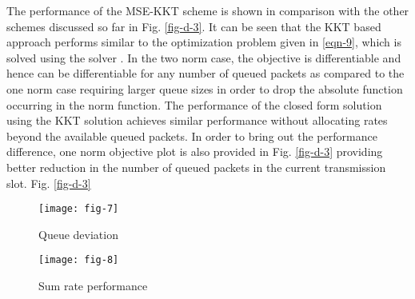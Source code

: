 The performance of the \ac{MSE}-\ac{KKT} scheme is shown in comparison with the other schemes discussed so far in Fig. \ref{fig-d-3}. It can be seen that the \ac{KKT} based approach performs similar to the optimization problem given in \eqref{eqn-9}, which is solved using the solver \cite{grant2008cvx}. In the two norm case, the objective is differentiable and hence can be differentiable for any number of queued packets as compared to the one norm case requiring larger queue sizes in order to drop the absolute function occurring in the norm function. The performance of the closed form solution using the \ac{KKT} solution achieves similar performance without allocating rates beyond the available queued packets. In order to bring out the performance difference, one norm objective plot is also provided in Fig. \ref{fig-d-3} providing better reduction in the number of queued packets in the current transmission slot.
Fig. \ref{fig-d-3}
\begin{figure*}
\centering
\begin{subfigure}{0.49\textwidth}
\texttt{[image: fig-7]}
\caption{Queue deviation}
\end{subfigure}
\hfill
\begin{subfigure}{0.49\textwidth}
\texttt{[image: fig-8]}
\caption{Sum rate performance}
\end{subfigure}
\caption{Convergence plot for  model}
\label{fig-d-3}
\end{figure*}
